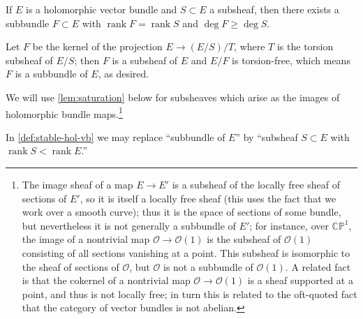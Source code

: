\documentclass[12pt,letterpaper,reqno]{article}
\numberwithin{equation}{section}
\newcommand{\cO}{\ensuremath{\mathcal O}}
\newcommand{\C}{\ensuremath{\mathbb C}}
\newcommand{\PP}{\ensuremath{\mathbb P}}
\DeclareMathOperator{\rank}{rank}
\newcommand{\fixme}[1]{{\color{orange}{[#1]}}}
\begin{document}
\fixme{need to briefly introduce language of coherent sheaves here,
locally free sheaves,
their degrees and ranks, additivity in exact sequences,
characterization of subbundles by fact that quotient is torsion-free, fact that
over a smooth curve the sheaf kernel of bundle map is a bundle}

\begin{lem} \label{lem:saturation}
If $E$ is a holomorphic vector bundle and $S \subset E$ a subsheaf,
then there exists a subbundle $F \subset E$
with $\rank F = \rank S$
and $\deg F \ge \deg S$.
\end{lem}
\begin{pf} Let $F$ be the kernel of the
projection $E \to (E/S)/T$, where $T$ is the torsion subsheaf of $E/S$;
then $F$ is a subsheaf of $E$ and 
$E/F$ is torsion-free, which means $F$ is a subbundle of $E$,
as desired.
\end{pf}

We will use \autoref{lem:saturation} 
below for subsheaves which arise as the images of
holomorphic bundle maps.\footnote{The image sheaf of a map $E \to E'$ 
is a subsheaf of the locally free sheaf of sections of $E'$, so
it is itself a locally free sheaf (this uses the fact that we work over
a smooth curve);
thus it is the space of sections of some bundle, but nevertheless it is not
generally a subbundle of $E'$; for instance, over $\C\PP^1$, 
the image of a nontrivial map $\cO \to \cO(1)$ is the subsheaf of $\cO(1)$
consisting of all sections vanishing at a point. This subsheaf is isomorphic
to the sheaf of sections of $\cO$, but
$\cO$ is not a subbundle of $\cO(1)$. A related fact is that
the cokernel of a nontrivial map $\cO \to \cO(1)$ is a sheaf supported
at a point, and thus is not locally free; in turn this is related
to the oft-quoted fact that the category of vector bundles is not abelian.}

\begin{cor}
In \autoref{def:stable-hol-vb} we may replace ``subbundle of $E$'' by ``subsheaf $S \subset E$
with $\rank S < \rank E$.''
\end{cor}
\end{document}

